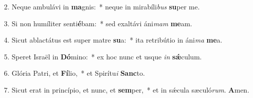 2. Neque ambulávi in \textbf{ma}gnis:~*  neque in mirabíli\textit{bus} \textbf{su}per me.\

3. Si non humíliter senti\textbf{é}bam:~*  sed exaltávi áni\textit{mam} \textbf{me}am.\

4. Sicut ablactátus est super matre \textbf{su}a:~*  ita retribútio in áni\textit{ma} \textbf{me}a.\

5. Speret Israël in \textbf{Dó}mino:~*  ex hoc nunc et usque \textit{in} \textbf{sǽ}culum.\

6. Glória Patri, et \textbf{Fí}lio,~*  et Spirítu\textit{i} \textbf{Sanc}to.\

7. Sicut erat in princípio, et nunc, et \textbf{sem}per,~*  et in sǽcula sæculó\textit{rum}. \textbf{A}men.\

